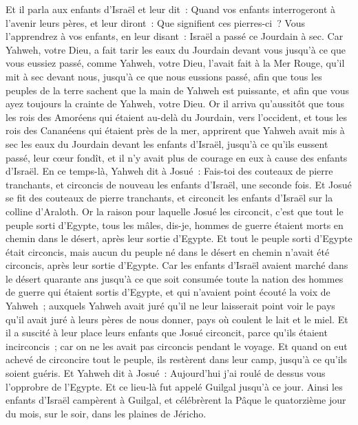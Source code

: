 \begin{multicols}{2}
Et il parla aux enfants d'Israël et leur dit~: Quand vos enfants interrogeront à l'avenir leurs pères, et leur diront~: Que signifient ces pierres-ci~?
Vous l'apprendrez à vos enfants, en leur disant~: Israël a passé ce Jourdain à sec.
Car Yahweh, votre Dieu, a fait tarir les eaux du Jourdain devant vous jusqu'à ce que vous eussiez passé, comme Yahweh, votre Dieu, l'avait fait à la Mer Rouge, qu'il mit à sec devant nous, jusqu'à ce que nous eussions passé,
afin que tous les peuples de la terre sachent que la main de Yahweh est puissante, et afin que vous ayez toujours la crainte de Yahweh, votre Dieu.
\VerseOne{}Or il arriva qu'aussitôt que tous les rois des Amoréens qui étaient au-delà du Jourdain, vers l'occident, et tous les rois des Cananéens qui étaient près de la mer, apprirent que Yahweh avait mis à sec les eaux du Jourdain devant les enfants d'Israël, jusqu'à ce qu'ils eussent passé, leur cœur fondît, et il n'y avait plus de courage en eux à cause des enfants d'Israël.
En ce temps-là, Yahweh dit à Josué~: Fais-toi des couteaux de pierre tranchants, et circoncis de nouveau les enfants d'Israël, une seconde fois.
Et Josué se fit des couteaux de pierre tranchants, et circoncit les enfants d'Israël sur la colline d'Araloth.
Or la raison pour laquelle Josué les circoncit, c'est que tout le peuple sorti d'Egypte, tous les mâles, dis-je, hommes de guerre étaient morts en chemin dans le désert, après leur sortie d'Egypte.
Et tout le peuple sorti d'Egypte était circoncis, mais aucun du peuple né dans le désert en chemin n'avait été circoncis, après leur sortie d'Egypte.
Car les enfants d'Israël avaient marché dans le désert quarante ans jusqu'à ce que soit consumée toute la nation des hommes de guerre qui étaient sortis d'Egypte, et qui n'avaient point écouté la voix de Yahweh~; auxquels Yahweh avait juré qu'il ne leur laisserait point voir le pays qu'il avait juré à leurs pères de nous donner, pays où coulent le lait et le miel.
Et il a suscité à leur place leurs enfants que Josué circoncit, parce qu'ils étaient incirconcis~; car on ne les avait pas circoncis pendant le voyage.
Et quand on eut achevé de circoncire tout le peuple, ils restèrent dans leur camp, jusqu'à ce qu'ils soient guéris.
Et Yahweh dit à Josué~: Aujourd'hui j'ai roulé de dessus vous l'opprobre de l'Egypte. Et ce lieu-là fut appelé Guilgal jusqu'à ce jour.
Ainsi les enfants d'Israël campèrent à Guilgal, et célébrèrent la Pâque le quatorzième jour du mois, sur le soir, dans les plaines de Jéricho.

\end{multicols}
